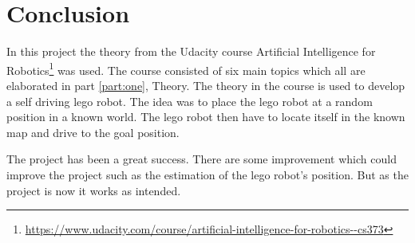 \chapter{Conclusion}
\label{chp:conc}

In this project the theory from the Udacity course Artificial Intelligence for Robotics\footnote{\url{https://www.udacity.com/course/artificial-intelligence-for-robotics--cs373}} was used. The course consisted of six main topics which all are elaborated in part \ref{part:one}, Theory. The theory in the course is used to develop a self driving lego robot. The idea was to place the lego robot at a random position in a known world. The lego robot then have to locate itself in the known map and drive to the goal position.

The project has been a great success. There are some improvement which could improve the project such as the estimation of the lego robot's position. But as the project is now it works as intended.